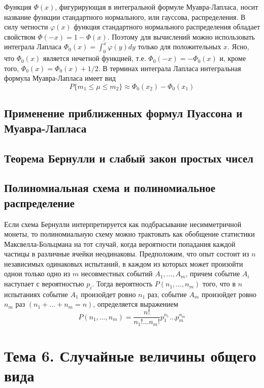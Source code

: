 \documentclass[12pt]{article}
\begin{document}
Функция $\Phi(x)$, фигурирующая в интегральной формуле Муавра-Лапласа,
носит название функции стандартного нормального, или гауссова, распределения.
В силу четности $\varphi(x)$ функция стандартного нормального распределения обладает свойством
$\Phi(-x) = 1 - \Phi(x)$. Поэтому для вычислений можно использовать интеграла Лапласа
$\Phi_0(x) = \int^x_0\varphi(y)dy$ только для положительных $x$.
Ясно, что $\Phi_0(x)$ является нечетной функцией,
т.е. $\Phi_0(-x) = -\Phi_0(x)$ и, кроме того, $\Phi_0(x) = \Phi_0(x) + 1/2$.
В терминах интеграла Лапласа интегральная формула Муавра-Лапласа имеет вид
\[P\{m_1 \leq \mu \leq m_2\} \approx \Phi_0(x_2) - \Phi_0(x_1)\]

\subsection{Применение приближенных формул Пуассона и Муавра-Лапласа}
\subsection{Теорема Бернулли и слабый закон простых чисел}
\subsection{Полиномиальная схема и полиномиальное распределение}
Если схема Бернулли интерпретируется как подбрасывание несимметричной монеты,
то полиномиальную схему можно трактовать как обобщение статистики Максвелла-Больцмана на тот случай,
когда вероятности попадания каждой частицы в различные ячейки неодинаковы.
Предположим, что опыт состоит из $n$ независимых одинаковых испытаний,
в каждом из которых может произойти однои только одно из $m$ несовместных событий $A_1, ..., A_m$,
причем событие $A_i$ наступает с вероятностью $p_i$.
Тогда вероятность $P(n_1, ..., n_m)$ того, что в $n$ испытаниях событие $A_1$ произойдет ровно $n_1$ раз,
событие $A_m$ произойдет ровно $n_m$ раз $(n_1 + ... + n_m = n)$, определяется выражением
\[P(n_1, ..., n_m) = \frac{n!}{n_1!...n_m!}p_1^{n_1}...p_m^{n_m}\]

\section{Тема 6. Случайные величины общего вида}
\end{document}
